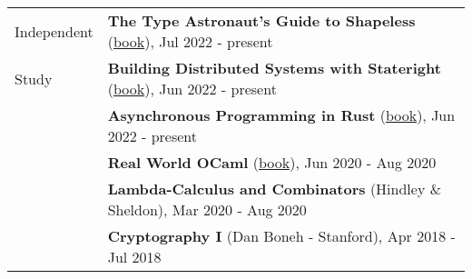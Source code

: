 \documentclass[letterpaper,10pt,oneside]{article}
\begin{document}
\noindent \begin{tabular}{@{} l l}
 \Large{Independent} & \textbf{The Type Astronaut's Guide to Shapeless} (\href{https://books.underscore.io/shapeless-guide/shapeless-guide.html}{book}), Jul 2022 - present \\
 \Large{Study} & \textbf{Building Distributed Systems with Stateright} (\href{https://www.stateright.rs/title-page.html}{book}), Jun 2022 - present \\
 \hspace{1.1in} & \textbf{Asynchronous Programming in Rust} (\href{https://github.com/rust-lang/async-book}{book}), Jun 2022 - present \\
 & \textbf{Real World OCaml} (\href{https://dev.realworldocaml.org/index.html}{book}), Jun 2020 - Aug 2020 \\
 & \textbf{Lambda-Calculus and Combinators} (Hindley \& Sheldon), Mar 2020 - Aug 2020 \\
 & \textbf{Cryptography I} (Dan Boneh - Stanford), Apr 2018 - Jul 2018 \\
\end{tabular}
\end{document}
